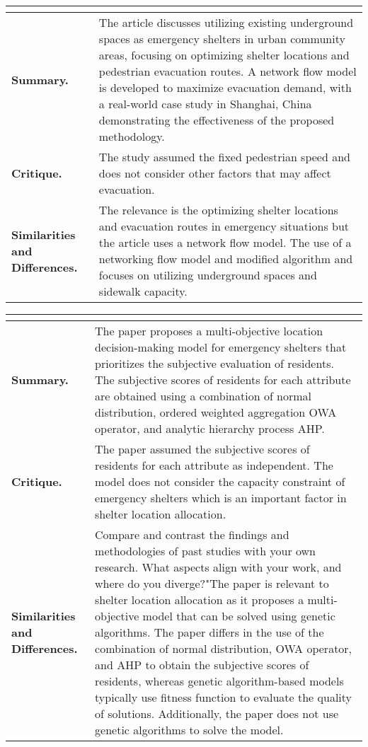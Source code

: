 \begin{longtable}{|L{.2\linewidth}|L{.74\linewidth}|}
	\hline
	\\ \hline
	\textbf{Summary.} & The article discusses utilizing existing underground spaces as emergency shelters in urban community areas, focusing on optimizing shelter locations and pedestrian evacuation routes. A network flow model is developed to maximize evacuation demand, with a real-world case study in Shanghai, China demonstrating the effectiveness of the proposed methodology.\\ \hline
	\textbf{Critique.} & The study assumed the fixed pedestrian speed and does not consider other factors that may affect evacuation.\\ \hline
	\textbf{Similarities and Differences.} & The relevance is the optimizing shelter locations and evacuation routes in emergency situations but the article uses a network flow model.	The use of a networking flow model and modified algorithm and focuses on utilizing underground spaces and sidewalk capacity.\\ \hline
\end{longtable}

\begin{longtable}{|L{.2\linewidth}|L{.74\linewidth}|}
	\hline
	\\ \hline
	\textbf{Summary.} & The paper proposes a multi-objective location decision-making model for emergency shelters that prioritizes the subjective evaluation of residents. The subjective scores of residents for each attribute are obtained using a combination of normal distribution, ordered weighted aggregation OWA operator, and analytic hierarchy process AHP.\\ \hline
	\textbf{Critique.} & The paper assumed the subjective scores of residents for each attribute as independent. The model does not consider the capacity constraint of emergency shelters which is an important factor in shelter location allocation.\\ \hline
	\textbf{Similarities and Differences.} & Compare and contrast the findings and methodologies of past studies with your own research. What aspects align with your work, and where do you diverge?"The paper is relevant to shelter location allocation as it proposes a multi-objective model that can be solved using genetic algorithms. The paper differs in the use of the combination of normal distribution, OWA operator, and AHP to obtain the subjective scores of residents, whereas genetic algorithm-based models typically use fitness function to evaluate the quality of solutions. Additionally, the paper does not use genetic algorithms to solve the model.\\ \hline
\end{longtable}

